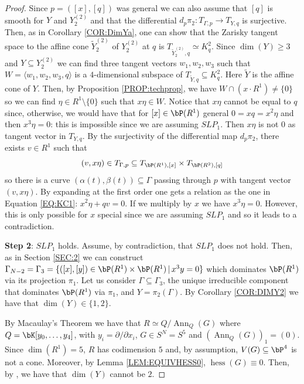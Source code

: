 \documentclass[a4paper,11pt]{amsart}
\DeclareMathOperator{\Ann}{Ann}
\DeclareMathOperator{\hess}{hess}
\begin{document}
\begin{proof}
Since $p=([x],[q])$ was general we can also assume that $[q]$ is smooth for $Y$ and $Y^{(2)}_2$ and that the differential $d_p\pi_2:T_{\Gamma,p}\to T_{Y,q}$ is surjective. Then, as in Corollary \ref{COR:DimYa}, one can show that the Zarisky tangent space to the affine cone $\tilde{Y}_2^{(2)}$ of $Y_2^{(2)}$ at $q$ is $T_{\tilde{Y}_2^{(2)},q}\simeq K^2_{q}$. Since $\dim(Y)\geq 3$ and $Y\subseteq Y_2^{(2)}$ we can find three tangent vectors $w_1,w_2,w_3$ such that $W=\langle w_1,w_2,w_3,q\rangle$ is a $4$-dimensional subspace of $T_{\tilde{Y},q}\subseteq K^2_q$. Here $\tilde{Y}$ is the affine cone of $Y$. 
Then, by Proposition \ref{PROP:techprop}, we have $W\cap (x\cdot R^1)\neq \{0\}$ so we can find $\eta\in R^1\setminus \{0\}$ such that $x\eta\in W$. Notice that $x\eta$ cannot be equal to $q$ since, otherwise, we would have that for $[x]\in \bP(R^1)$ general $0=xq=x^2\eta$ and then $x^3\eta=0$: this is impossible since we are assuming $SLP_1$. Then $x\eta$ is not $0$ as tangent vector in $T_{Y,q}$. By the surjectivity of the differential map $d_p\pi_2$, there exists $v\in R^1$ such that 
$$(v,x\eta)\in T_{\Gamma,p}\subseteq T_{\bP(R^1),[x]}\times T_{\bP(R^2),[q]}$$ 
so there is a curve $(\alpha(t),\beta(t))\subseteq \Gamma$ passing through $p$ with tangent vector $(v,x\eta)$. By expanding at the first order one gets a relation as the one in Equation \eqref{EQ:KC1}: $x^2\eta+qv=0$. If we multiply by $x$ we have $x^3\eta=0$. However, this is only possible for $x$ special since we are assuming $SLP_1$ and so it leads to a contradiction.
\vspace{2mm}

{\bf Step 2}: $SLP_1$ holds. 
Assume, by contradiction, that $SLP_1$ does not hold. Then, as in Section \ref{SEC:2} we can construct $\Gamma_{N-2}=\Gamma_3=\{([x],[y])\in \bP(R^1)\times \bP(R^1)\,|\, x^3y=0\}$ which dominates $\bP(R^1)$ via its projection $\pi_1$. Let us consider $\Gamma\subseteq\Gamma_3$, the unique irreducible component that dominates $\bP(R^1)$ via $\pi_1$, and $Y=\pi_2(\Gamma)$. By Corollary \ref{COR:DIMY2} we have that $\dim(Y)\in \{1,2\}$.

By Macaulay's Theorem we have that $R\simeq Q/\Ann_Q(G)$ where $Q=\bK[y_0,\dots, y_4]$, with $y_i=\partial/\partial x_i$, $G\in S^N=S^5$ and $(\Ann_{Q}(G))_1=(0)$. Since $\dim(R^1)=5$, $R$ has codimension $5$ and, by assumption, $V(G)\subseteq \bP^4$ is not a cone. Moreover, by Lemma \ref{LEM:EQUIVHESS0}, $\hess(G)\equiv 0$. Then, by \cite[Lemma 7.4.13]{Rus16}, we have that $\dim(Y)$ cannot be $2$.
\vspace{2mm}


\end{proof}
\end{document}
